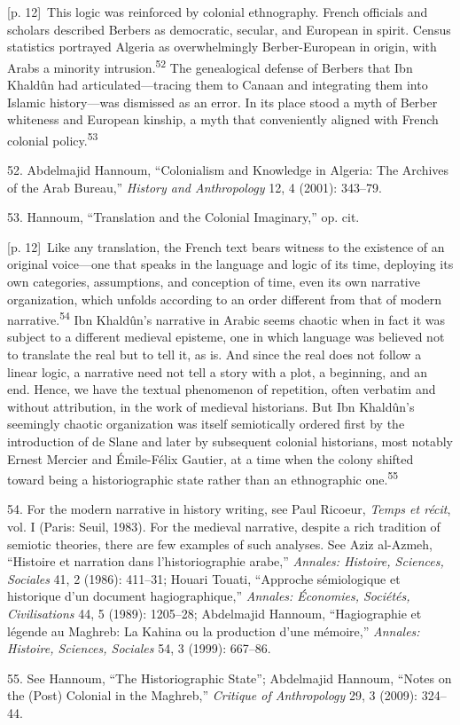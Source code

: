 \documentclass[10pt,a4paper]{article}
\begin{document}
{\scriptsize\color{gray} [p. 12]}\ This logic was reinforced by colonial ethnography. French officials and scholars described Berbers as democratic, secular, and European in spirit. Census statistics portrayed Algeria as overwhelmingly Berber-European in origin, with Arabs a minority intrusion.\nobreak\textsuperscript{52} The genealogical defense of Berbers that Ibn Khaldûn had articulated—tracing them to Canaan and integrating them into Islamic history—was dismissed as an error. In its place stood a myth of Berber whiteness and European kinship, a myth that conveniently aligned with French colonial policy.\nobreak\textsuperscript{53}\par{\small 52. Abdelmajid Hannoum, “Colonialism and Knowledge in Algeria: The Archives of the Arab Bureau,” \textit{History and Anthropology} 12, 4 (2001): 343–79.\par}{\small 53. Hannoum, “Translation and the Colonial Imaginary,” op. cit.\par}
{\scriptsize\color{gray} [p. 12]}\ Like any translation, the French text bears witness to the existence of an original voice—one that speaks in the language and logic of its time, deploying its own categories, assumptions, and conception of time, even its own narrative organization, which unfolds according to an order different from that of modern narrative.\nobreak\textsuperscript{54} Ibn Khaldûn’s narrative in Arabic seems chaotic when in fact it was subject to a different medieval episteme, one in which language was believed not to translate the real but to tell it, as is. And since the real does not follow a linear logic, a narrative need not tell a story with a plot, a beginning, and an end. Hence, we have the textual phenomenon of repetition, often verbatim and without attribution, in the work of medieval historians. But Ibn Khaldûn’s seemingly chaotic organization was itself semiotically ordered first by the introduction of de Slane and later by subsequent colonial historians, most notably Ernest Mercier and Émile-Félix Gautier, at a time when the colony shifted toward being a historiographic state rather than an ethnographic one.\nobreak\textsuperscript{55}\par{\small 54. For the modern narrative in history writing, see Paul Ricoeur, \textit{Temps et récit}, vol. I (Paris: Seuil, 1983). For the medieval narrative, despite a rich tradition of semiotic theories, there are few examples of such analyses. See Aziz al-Azmeh, “Histoire et narration dans l’historiographie arabe,” \textit{Annales: Histoire, Sciences, Sociales} 41, 2 (1986): 411–31; Houari Touati, “Approche sémiologique et historique d’un document hagiographique,” \textit{Annales: Économies, Sociétés, Civilisations} 44, 5 (1989): 1205–28; Abdelmajid Hannoum, “Hagiographie et légende au Maghreb: La Kahina ou la production d’une mémoire,” \textit{Annales: Histoire, Sciences, Sociales} 54, 3 (1999): 667–86.\par}{\small 55. See Hannoum, “The Historiographic State”; Abdelmajid Hannoum, “Notes on the (Post) Colonial in the Maghreb,” \textit{Critique of Anthropology} 29, 3 (2009): 324–44.\par}
\end{document}
